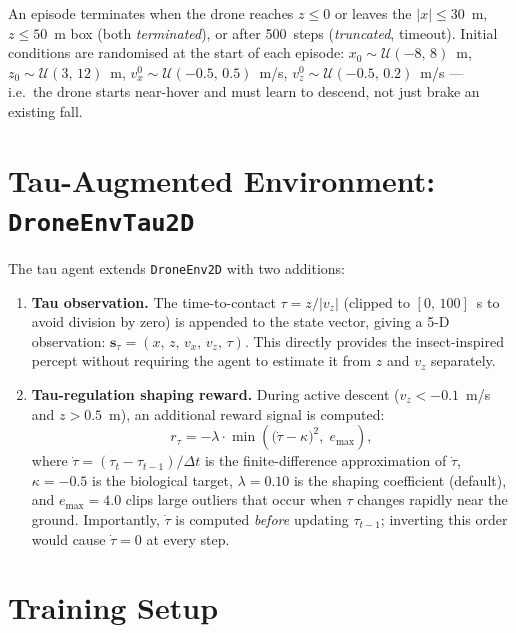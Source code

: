 An episode terminates when the drone reaches $z \leq 0$ or leaves the
$|x| \leq 30$~m, $z \leq 50$~m box (both \emph{terminated}), or after
500~steps (\emph{truncated}, timeout).
Initial conditions are randomised at the start of each episode:
$x_0 \sim \mathcal{U}(-8,\, 8)$~m, $z_0 \sim \mathcal{U}(3,\, 12)$~m,
$v_x^0 \sim \mathcal{U}(-0.5,\, 0.5)$~m/s, $v_z^0 \sim \mathcal{U}(-0.5,\, 0.2)$~m/s
--- i.e.\ the drone starts near-hover and must learn to descend, not just
brake an existing fall.

\section{Tau-Augmented Environment: \texttt{DroneEnvTau2D}}
\label{sec:env_tau}

The tau agent extends \texttt{DroneEnv2D} with two additions:

\begin{enumerate}
  \item \textbf{Tau observation.}
        The time-to-contact $\tau = z / |v_z|$ (clipped to $[0,\, 100]$~s to avoid
        division by zero) is appended to the state vector, giving a 5-D observation:
        $\mathbf{s}_\tau = (x,\, z,\, v_x,\, v_z,\, \tau)$.
        This directly provides the insect-inspired percept without requiring the agent
        to estimate it from $z$ and $v_z$ separately.

  \item \textbf{Tau-regulation shaping reward.}
        During active descent ($v_z < -0.1$~m/s and $z > 0.5$~m), an additional
        reward signal is computed:
        \begin{equation}
          r_\tau = -\lambda \cdot \min\!\left(\bigl(\dot{\tau} - \kappa\bigr)^2,\;
          e_{\max}\right),
          \label{eq:tau_reward}
        \end{equation}
        where $\dot{\tau} = (\tau_t - \tau_{t-1}) / \Delta t$ is the finite-difference
        approximation of $\dot{\tau}$, $\kappa = -0.5$ is the biological target,
        $\lambda = 0.10$ is the shaping coefficient (default), and $e_{\max} = 4.0$
        clips large outliers that occur when $\tau$ changes rapidly near the ground.
        Importantly, $\dot{\tau}$ is computed \emph{before} updating $\tau_{t-1}$;
        inverting this order would cause $\dot{\tau} = 0$ at every step.
\end{enumerate}

\section{Training Setup}
\label{sec:training}

